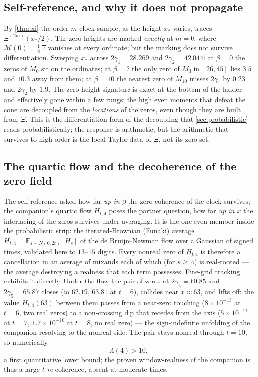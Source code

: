 \documentclass[11pt,reqno]{amsart}
\theoremstyle{plain}
\theoremstyle{definition}
\theoremstyle{remark}
\newcommand{\E}{\mathbb E}
\newcommand{\Mcal}{\mathcal M}
\begin{document}
\subsection{Self-reference, and why it does not propagate}
By \cref{thm:xi} the order-$m$ clock sample, as the height $x_*$ varies,
traces $\Xi^{(2m)}(x_*/2)$. The zero heights are marked \emph{exactly} at
$m=0$, where $\Mcal(0)=\tfrac18\Xi$ vanishes at every ordinate; but the
marking does not survive differentiation. Sweeping $x_*$ across
$2\gamma_1=28.269$ and $2\gamma_2=42.044$: at $\beta=0$ the zeros of $M_0$
sit on the ordinates; at $\beta=3$ the only zero of $M_3$ in $[26,45]$ lies
$3.5$ and $10.3$ away from them; at $\beta=10$ the nearest zero of $M_{10}$
misses $2\gamma_1$ by $0.23$ and $2\gamma_2$ by $1.9$. The zero-height
signature is exact at the bottom of the ladder and effectively gone within a
few rungs: the high even moments that defeat the cone are decoupled from the
\emph{locations} of the zeros, even though they are built from $\Xi$. This is
the differentiation form of the decoupling that \cref{sec:probabilistic}
reads probabilistically; the response is arithmetic, but the arithmetic that
survives to high order is the local Taylor data of $\Xi$, not its zero set.

\subsection{The quartic flow and the decoherence of the zero field}
\label{subsec:quartic}
The self-reference asked how far \emph{up in $\beta$} the zero-coherence of
the clock survives; the companion's quartic flow $H_{t,4}$ poses the partner
question, how far \emph{up in $x$} the interlacing of the zeros survives
under averaging. It is the one even member inside the probabilistic strip:
the iterated-Brownian (Funaki) average $H_{t,4}=\E_{s\sim N(0,2t)}[H_s]$ of
the de Bruijn--Newman flow over a Gaussian of signed times, validated here
to $13$--$15$ digits. Every nonreal zero of $H_{t,4}$ is therefore a
cancellation in an average of mixands each of which (for $s\ge\Lambda$) is
real-rooted --- the average destroying a realness that each term possesses.
Fine-grid tracking exhibits it directly. Under the flow the pair of zeros at
$2\gamma_4=60.85$ and $2\gamma_5=65.87$ closes (to $62.19,\,63.81$ at
$t=6$), collides near $x\approx63$, and lifts off: the value $H_{t,4}(63)$
between them passes from a near-zero touching ($8\times10^{-13}$ at $t=6$,
two real zeros) to a non-crossing dip that recedes from the axis
($5\times10^{-11}$ at $t=7$, $1.7\times10^{-10}$ at $t=8$, no real zero) ---
the sign-indefinite unfolding of the companion resolving to the nonreal
side. The pair stays nonreal through $t=10$, so numerically
\begin{equation}\label{eq:lam4}
  \Lambda(4)>10,
\end{equation}
a first quantitative lower bound; the proven window-realness of the
companion is thus a large-$t$ \emph{re}-coherence, absent at moderate times.
\end{document}
